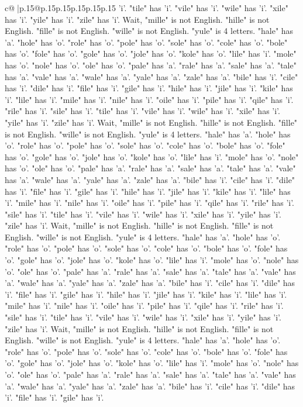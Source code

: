 \documentclass{article}
\begin{document}
{\begin{supertabular}{c@{$\;$}|p{.15\linewidth}@{}p{.15\linewidth}p{.15\linewidth}p{.15\linewidth}p{.15\linewidth}p{.15\linewidth}}
{{{'i'. "tile" has 'i'. "vile" has 'i'. "wile" has 'i'. "xile" has 'i'. "yile" has 'i'. "zile" has 'i'. Wait, "mille" is not English. "hille" is not English. "fille" is not English. "wille" is not English. "yule" is 4 letters. "hale" has 'a'. "hole" has 'o'. "role" has 'o'. "pole" has 'o'. "sole" has 'o'. "cole" has 'o'. "bole" has 'o'. "fole" has 'o'. "gole" has 'o'. "jole" has 'o'. "kole" has 'o'. "lile" has 'i'. "mole" has 'o'. "nole" has 'o'. "ole" has 'o'. "pale" has 'a'. "rale" has 'a'. "sale" has 'a'. "tale" has 'a'. "vale" has 'a'. "wale" has 'a'. "yale" has 'a'. "zale" has 'a'. "bile" has 'i'. "cile" has 'i'. "dile" has 'i'. "file" has 'i'. "gile" has 'i'. "hile" has 'i'. "jile" has 'i'. "kile" has 'i'. "lile" has 'i'. "mile" has 'i'. "nile" has 'i'. "oile" has 'i'. "pile" has 'i'. "qile" has 'i'. "rile" has 'i'. "sile" has 'i'. "tile" has 'i'. "vile" has 'i'. "wile" has 'i'. "xile" has 'i'. "yile" has 'i'. "zile" has 'i'. Wait, "mille" is not English. "hille" is not English. "fille" is not English. "wille" is not English. "yule" is 4 letters. "hale" has 'a'. "hole" has 'o'. "role" has 'o'. "pole" has 'o'. "sole" has 'o'. "cole" has 'o'. "bole" has 'o'. "fole" has 'o'. "gole" has 'o'. "jole" has 'o'. "kole" has 'o'. "lile" has 'i'. "mole" has 'o'. "nole" has 'o'. "ole" has 'o'. "pale" has 'a'. "rale" has 'a'. "sale" has 'a'. "tale" has 'a'. "vale" has 'a'. "wale" has 'a'. "yale" has 'a'. "zale" has 'a'. "bile" has 'i'. "cile" has 'i'. "dile" has 'i'. "file" has 'i'. "gile" has 'i'. "hile" has 'i'. "jile" has 'i'. "kile" has 'i'. "lile" has 'i'. "mile" has 'i'. "nile" has 'i'. "oile" has 'i'. "pile" has 'i'. "qile" has 'i'. "rile" has 'i'. "sile" has 'i'. "tile" has 'i'. "vile" has 'i'. "wile" has 'i'. "xile" has 'i'. "yile" has 'i'. "zile" has 'i'. Wait, "mille" is not English. "hille" is not English. "fille" is not English. "wille" is not English. "yule" is 4 letters. "hale" has 'a'. "hole" has 'o'. "role" has 'o'. "pole" has 'o'. "sole" has 'o'. "cole" has 'o'. "bole" has 'o'. "fole" has 'o'. "gole" has 'o'. "jole" has 'o'. "kole" has 'o'. "lile" has 'i'. "mole" has 'o'. "nole" has 'o'. "ole" has 'o'. "pale" has 'a'. "rale" has 'a'. "sale" has 'a'. "tale" has 'a'. "vale" has 'a'. "wale" has 'a'. "yale" has 'a'. "zale" has 'a'. "bile" has 'i'. "cile" has 'i'. "dile" has 'i'. "file" has 'i'. "gile" has 'i'. "hile" has 'i'. "jile" has 'i'. "kile" has 'i'. "lile" has 'i'. "mile" has 'i'. "nile" has 'i'. "oile" has 'i'. "pile" has 'i'. "qile" has 'i'. "rile" has 'i'. "sile" has 'i'. "tile" has 'i'. "vile" has 'i'. "wile" has 'i'. "xile" has 'i'. "yile" has 'i'. "zile" has 'i'. Wait, "mille" is not English. "hille" is not English. "fille" is not English. "wille" is not English. "yule" is 4 letters. "hale" has 'a'. "hole" has 'o'. "role" has 'o'. "pole" has 'o'. "sole" has 'o'. "cole" has 'o'. "bole" has 'o'. "fole" has 'o'. "gole" has 'o'. "jole" has 'o'. "kole" has 'o'. "lile" has 'i'. "mole" has 'o'. "nole" has 'o'. "ole" has 'o'. "pale" has 'a'. "rale" has 'a'. "sale" has 'a'. "tale" has 'a'. "vale" has 'a'. "wale" has 'a'. "yale" has 'a'. "zale" has 'a'. "bile" has 'i'. "cile" has 'i'. "dile" has 'i'. "file" has 'i'. "gile" has 'i'. }}}
\end{supertabular}}
\end{document}
